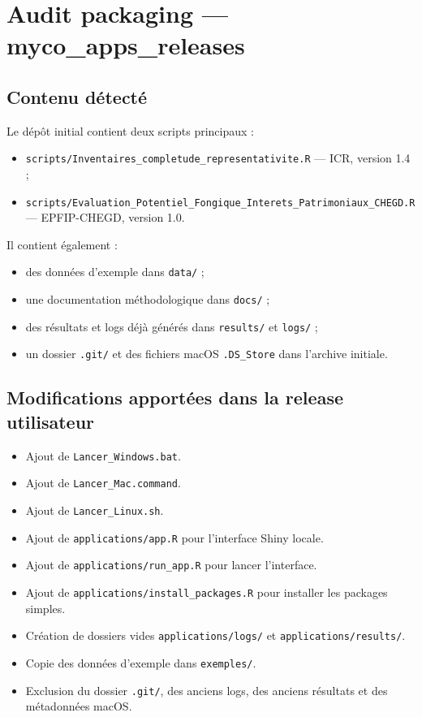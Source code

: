 \section{Audit packaging ---
myco\_apps\_releases}\label{audit-packaging-myco_apps_releases}

\subsection{Contenu détecté}\label{contenu-duxe9tectuxe9}

Le dépôt initial contient deux scripts principaux :

\begin{itemize}
\tightlist
\item
  \texttt{scripts/Inventaires\_completude\_representativite.R} --- ICR,
  version 1.4 ;
\item
  \texttt{scripts/Evaluation\_Potentiel\_Fongique\_Interets\_Patrimoniaux\_CHEGD.R}
  --- EPFIP-CHEGD, version 1.0.
\end{itemize}

Il contient également :

\begin{itemize}
\tightlist
\item
  des données d'exemple dans \texttt{data/} ;
\item
  une documentation méthodologique dans \texttt{docs/} ;
\item
  des résultats et logs déjà générés dans \texttt{results/} et
  \texttt{logs/} ;
\item
  un dossier \texttt{.git/} et des fichiers macOS \texttt{.DS\_Store}
  dans l'archive initiale.
\end{itemize}

\subsection{Modifications apportées dans la release
utilisateur}\label{modifications-apportuxe9es-dans-la-release-utilisateur}

\begin{itemize}
\tightlist
\item
  Ajout de \texttt{Lancer\_Windows.bat}.
\item
  Ajout de \texttt{Lancer\_Mac.command}.
\item
  Ajout de \texttt{Lancer\_Linux.sh}.
\item
  Ajout de \texttt{applications/app.R} pour l'interface Shiny locale.
\item
  Ajout de \texttt{applications/run\_app.R} pour lancer l'interface.
\item
  Ajout de \texttt{applications/install\_packages.R} pour installer les
  packages simples.
\item
  Création de dossiers vides \texttt{applications/logs/} et
  \texttt{applications/results/}.
\item
  Copie des données d'exemple dans \texttt{exemples/}.
\item
  Exclusion du dossier \texttt{.git/}, des anciens logs, des anciens
  résultats et des métadonnées macOS.
\end{itemize}

